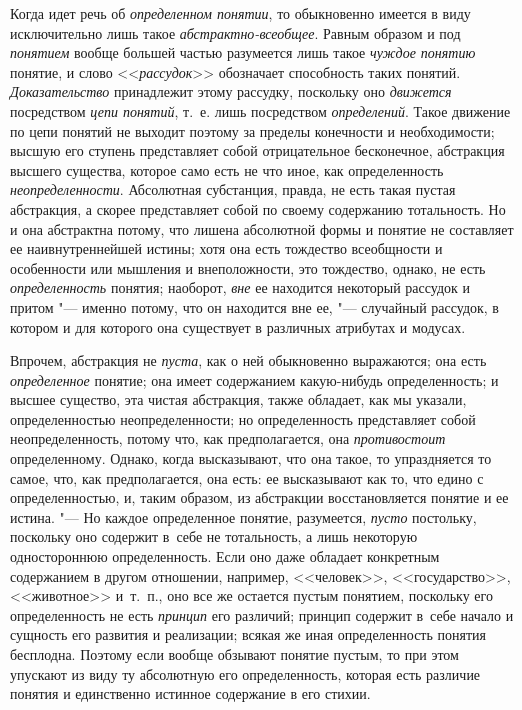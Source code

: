 Когда идет речь об {\em определенном понятии},
то обыкновенно имеется в виду исключительно лишь такое
{\em абстрактно-всеобщее}. Равным образом и под
{\em понятием} вообще большей частью разумеется лишь такое
{\em чуждое понятию} понятие, и слово <<{\em рассудок}>>
обозначает способность таких понятий. {\em Доказательство}
принадлежит этому рассудку, поскольку оно {\em движется}
посредством {\em цепи понятий}, т.~е. лишь посредством {\em определений}.
Такое движение по цепи понятий не выходит поэтому за пределы конечности и
необходимости; высшую его ступень представляет собой отрицательное
бесконечное, абстракция высшего существа, которое само есть не что иное,
как определенность {\em неопределенности}.
Абсолютная субстанция, правда, не есть такая пустая
абстракция, а скорее представляет собой по своему содержанию тотальность.
Но и она абстрактна потому, что лишена абсолютной формы и понятие не
составляет ее наивнутреннейшей истины; хотя она есть тождество всеобщности
и особенности или мышления и внеположности, это тождество,
однако, не есть {\em определенность} понятия; наоборот, {\em вне} ее находится
некоторый рассудок и притом "--- именно потому, что он
находится вне ее, "--- случайный рассудок, в котором и для
которого она существует в различных атрибутах и
модусах.

Впрочем, абстракция не {\em пуста}, как о ней
обыкновенно выражаются; она есть {\em определенное}
понятие; она имеет содержанием какую-нибудь определенность; и
высшее существо, эта чистая абстракция, также обладает, как мы указали,
определенностью неопределенности; но определенность представляет собой
неопределенность, потому что, как предполагается, она {\em противостоит}
определенному. Однако, когда высказывают, что она такое, то
упраздняется то самое, что, как предполагается, она есть: ее высказывают
как то, что едино с определенностью, и, таким образом, из абстракции
восстановляется понятие и ее истина. "--- Но каждое
определенное понятие, разумеется, {\em пусто} постольку,
поскольку оно содержит в~себе не тотальность, а лишь некоторую одностороннюю
определенность. Если оно даже обладает конкретным содержанием в другом
отношении, например, <<человек>>, <<государство>>, <<животное>> и~т.~п.,
оно все же остается пустым понятием, поскольку его определенность не есть
{\em принцип} его различий; принцип содержит в~себе начало и сущность его
развития и реализации; всякая же иная определенность понятия бесплодна. Поэтому
если вообще обзывают понятие пустым, то при этом упускают из виду ту абсолютную
его определенность, которая есть различие понятия и единственно истинное
содержание в его стихии.

